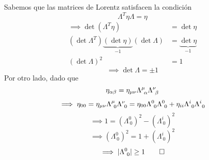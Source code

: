 \begin{prueba}
	Sabemos que las matrices de Lorentz satisfacen la condición
	\begin{equation}
  \Lambda^T\eta \Lambda=\eta
\end{equation}
\begin{align}
  \implies \det (\Lambda^T\eta)&=\det\eta \\
  (\det\Lambda^T)\underbrace{(\det\eta)}_{-1}(\det\Lambda)&=\underbrace{\det\eta}_{-1} \\
  (\det\Lambda)^2&=1
\end{align}
\begin{equation}
  \implies \boxed{\det\Lambda=\pm 1}
\end{equation}
Por otro lado, dado que
\begin{equation}
  \eta_{\alpha\beta }=\eta_{\mu\nu}\Lambda^\mu_{~\alpha}\Lambda^\nu_{~\beta }
\end{equation}
\begin{equation}
  \implies \eta_{00 }=\eta_{\mu\nu}\Lambda^\mu_{~0}\Lambda^\nu_{~0 }=\eta_{00}\Lambda^0_{~0}\Lambda^0_{~0 }+\eta_{ii}\Lambda^{i}_{~0}\Lambda^{i}_{~0 }
\end{equation}
\begin{equation}
  \implies 1=(\Lambda^0_{~0})^2-(\Lambda^{i}_{~0})^2
\end{equation}
\begin{equation}
  \implies (\Lambda^0_{~0})^2=1+(\Lambda^{i}_{~0})^2
\end{equation}
\begin{equation}
  \implies |\Lambda^0_{~0}|\geq 1 \qed 
\end{equation}
\end{prueba}

